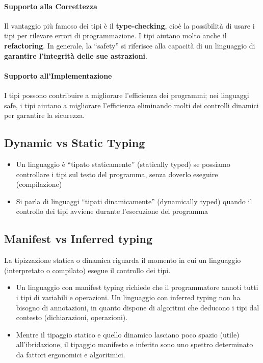 \documentclass[a4paper,12pt]{article}
\begin{document}
\paragraph{Supporto alla Correttezza} Il vantaggio più famoso dei tipi è il \textbf{type-checking}, cioè la possibilità di usare i tipi
per rilevare errori di programmazione. I tipi aiutano molto anche il \textbf{refactoring}. In generale, la “safety” si riferisce alla capacità di un linguaggio di \textbf{garantire l'integrità delle sue astrazioni}.
\paragraph{Supporto all’Implementazione} I tipi possono contribuire a migliorare l'efficienza dei programmi; nei linguaggi safe, i tipi aiutano a migliorare l'efficienza eliminando molti dei
controlli dinamici per garantire la sicurezza. 
\subsection*{Dynamic vs Static Typing}
\begin{itemize}
  \item Un linguaggio è “tipato staticamente” (statically typed) se possiamo controllare
i tipi sul testo del programma, senza doverlo eseguire (compilazione)
  \item Si parla di linguaggi “tipati dinamicamente” (dynamically typed) quando il
controllo dei tipi avviene durante l'esecuzione del programma 
\end{itemize}
\subsection*{Manifest vs Inferred typing}
La tipizzazione statica o dinamica riguarda il momento in cui un linguaggio (interpretato o
compilato) esegue il controllo dei tipi. 
\begin{itemize}
  \item Un linguaggio con manifest typing richiede che il programmatore annoti tutti i tipi di variabili e
operazioni. Un linguaggio con inferred typing non ha bisogno di annotazioni, in quanto dispone di
algoritmi che deducono i tipi dal contesto (dichiarazioni, operazioni).
  \item Mentre il tipaggio statico e quello dinamico lasciano poco spazio (utile) all'ibridazione, il tipaggio
manifesto e inferito sono uno spettro determinato da fattori ergonomici e algoritmici. 
\end{itemize}
\end{document}
